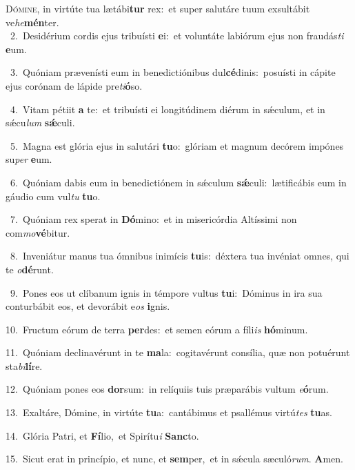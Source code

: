 \lettrine{\initial\textcolor{\initialcolor}{D}}{ómine,} in virtúte tua lætábi\textbf{tur} rex:~\star et super salutáre tuum exsultábit ve\-\textit{he}\-\textbf{mén}ter.\\
{\numbfont\textcolor{\numbcolor}{~2.}}~Desidérium cordis ejus tribuísti \textbf{e}\-i:~\star et voluntáte labiórum ejus non fraudás\textit{ti} \textbf{e}\-um.\par
{\numbfont\textcolor{\numbcolor}{~3.}}~Quóniam prævenísti eum in benedictiónibus dul\-\textbf{cé}\-dinis:~\star posuísti in cápite ejus corónam de lápide pre\-\textit{ti}\-\textbf{ó}so.\par
{\numbfont\textcolor{\numbcolor}{~4.}}~Vitam pétiit \textbf{a} te:~\star et tribuísti ei longitúdinem diérum in sǽculum, et in sǽcu\textit{lum} \textbf{sǽ}\-culi.\par
{\numbfont\textcolor{\numbcolor}{~5.}}~Magna est glória ejus in salutári \textbf{tu}\-o:~\star glóriam et magnum decórem impónes su\textit{per} \textbf{e}\-um.\par
{\numbfont\textcolor{\numbcolor}{~6.}}~Quóniam dabis eum in benedictiónem in sǽculum \textbf{sǽ}\-culi:~\star lætificábis eum in gáudio cum vul\textit{tu} \textbf{tu}\-o.\par
{\numbfont\textcolor{\numbcolor}{~7.}}~Quóniam rex sperat in \textbf{Dó}\-mino:~\star et in misericórdia Altíssimi non com\-\textit{mo}\-\textbf{vé}bitur.\par
{\numbfont\textcolor{\numbcolor}{~8.}}~Inveniátur manus tua ómnibus inimícis \textbf{tu}\-is:~\star déxtera tua invéniat omnes, qui te \textit{o}\-\textbf{dé}runt.\par
{\numbfont\textcolor{\numbcolor}{~9.}}~Pones eos ut clíbanum ignis in témpore vultus \textbf{tu}\-i:~\star Dóminus in ira sua conturbábit eos, et devorábit e\textit{os} \textbf{i}\-gnis.\par
{\numbfont\textcolor{\numbcolor}{10.}}~Fructum eórum de terra \textbf{per}\-des:~\star et semen eórum a fíli\textit{is} \textbf{hó}\-minum.\par
{\numbfont\textcolor{\numbcolor}{11.}}~Quóniam declinavérunt in te \textbf{ma}\-la:~\star cogitavérunt consília, quæ non potuérunt sta\-\textit{bi}\-\textbf{lí}re.\par
{\numbfont\textcolor{\numbcolor}{12.}}~Quóniam pones eos \textbf{dor}\-sum:~\star in relíquiis tuis præparábis vultum \textit{e}\-\textbf{ó}rum.\par
{\numbfont\textcolor{\numbcolor}{13.}}~Exaltáre, Dómine, in virtúte \textbf{tu}\-a:~\star cantábimus et psallémus virtú\textit{tes} \textbf{tu}\-as.\par
{\numbfont\textcolor{\numbcolor}{14.}}~Glória Patri, et \textbf{Fí}\-lio,~\star et Spirítu\textit{i} \textbf{Sanc}\-to.\par
{\numbfont\textcolor{\numbcolor}{15.}}~Sicut erat in princípio, et nunc, et \textbf{sem}\-per,~\star et in sǽcula sæculó\-\textit{rum}\-. \textbf{A}\-men.\par
